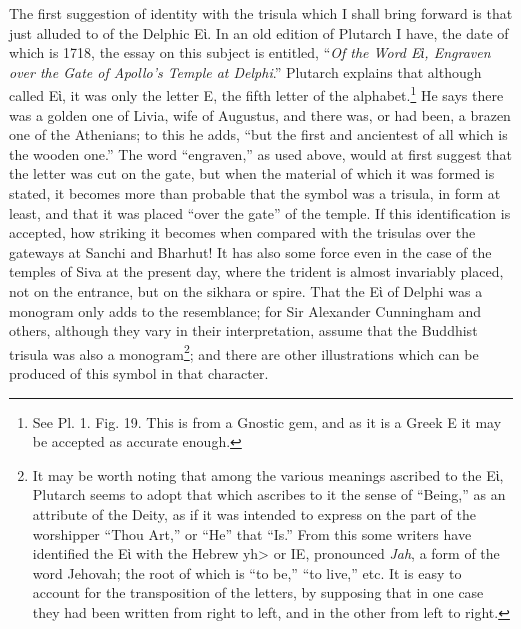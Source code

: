 \documentclass[a4paper, 11pt, oneside, english]{article}
\begin{document}
The first suggestion of identity with the trisula which I shall bring forward is that just alluded to of the Delphic Εὶ. In an old edition of Plutarch I have, the date of which is 1718, the essay on this subject is entitled, ``\emph{Of the Word Εὶ, Engraven over the Gate of Apollo's Temple at Delphi}.'' Plutarch explains that although called Εὶ, it was only the letter Ε, the fifth letter of the alphabet.\footnote{See Pl. 1. Fig. 19. This is from a Gnostic gem, and as it is a Greek Ε it may be accepted as accurate enough.} He says there was a golden one of Livia, wife of Augustus, and there was, or had been, a brazen one of the Athenians; to this he adds, ``but the first and ancientest of all which is the wooden one.'' The word ``engraven,'' as used above, would at first suggest that the letter was cut on the gate, but when the material of which it was formed is stated, it becomes more than probable that the symbol was a trisula, in form at least, and that it was placed ``over the gate'' of the temple. If this identification is accepted, how striking it becomes when compared with the trisulas over the gateways at Sanchi and Bharhut! It has also some force even in the case of the temples of Siva at the present day, where the trident is almost invariably placed, not on the entrance, but on the sikhara or spire. That the Εὶ of Delphi was a monogram only adds to the resemblance; for Sir Alexander Cunningham and others, although they vary in their interpretation, assume that the Buddhist trisula was also a monogram\footnote{It may be worth noting that among the various meanings ascribed to the Εὶ, Plutarch seems to adopt that which ascribes to it the sense of ``Being,'' as an attribute of the Deity, as if it was intended to express on the part of the worshipper ``Thou Art,'' or ``He'' that ``Is.'' From this some writers have identified the Εὶ with the Hebrew \<yh> or IE, pronounced \emph{Jah}, a form of the word Jehovah; the root of which is ``to be,'' ``to live,'' etc. It is easy to account for the transposition of the letters, by supposing that in one case they had been written from right to left, and in the other from left to right.}; and there are other illustrations which can be produced of this symbol in that character.
\end{document}
